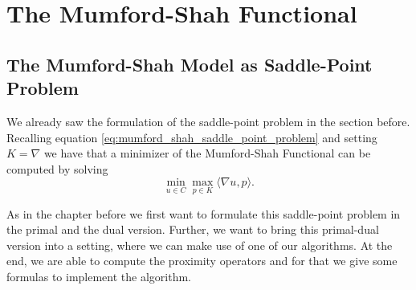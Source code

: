 \section{The Mumford-Shah Functional} %
\label{sec:the_mumford_shah_functional}

	\subsection{The Mumford-Shah Model as Saddle-Point Problem} %
	\label{sub:the_mumford_shah_model_as_saddle_point_problem}
	
		We already saw the formulation of the saddle-point problem in the section before. Recalling equation \ref{eq:mumford_shah_saddle_point_problem} and setting $K = \nabla$ we have that a minimizer of the Mumford-Shah Functional can be computed by solving
			\begin{equation}
				\min_{u \in C} \max_{p \in K} \langle \nabla u, p \rangle.
				\label{eq:primal_dual_mumford_shah}
			\end{equation}

		As in the chapter before we first want to formulate this saddle-point problem in the primal and the dual version. Further, we want to bring this primal-dual version into a setting, where we can make use of one of our algorithms. At the end, we are able to compute the proximity operators and for that we give some formulas to implement the algorithm.

